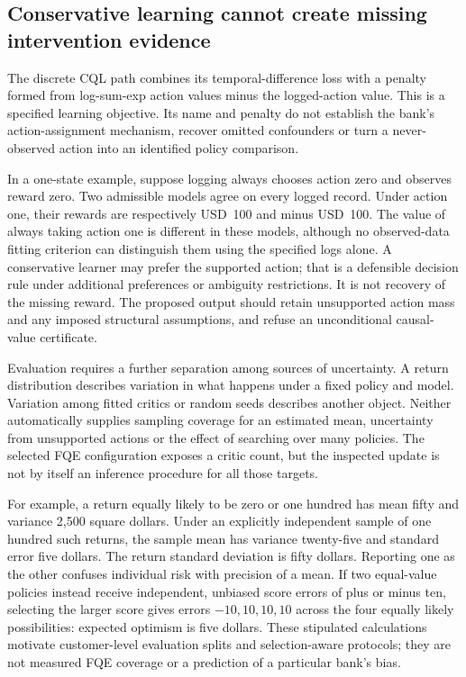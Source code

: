 \subsection{Conservative learning cannot create missing intervention evidence}

The discrete CQL path combines its temporal-difference loss with a penalty
formed from log-sum-exp action values minus the logged-action value. This is
a specified learning objective. Its name and penalty do not establish the
bank's action-assignment mechanism, recover omitted confounders or turn a
never-observed action into an identified policy comparison.
\citep{exec15_d3rlpy_value}

In a one-state example, suppose logging always chooses action zero and
observes reward zero. Two admissible models agree on every logged record.
Under action one, their rewards are respectively USD~100 and minus USD~100.
The value of always taking action one is different in these models, although
no observed-data fitting criterion can distinguish them using the specified
logs alone. A conservative learner may prefer the supported action; that is
a defensible decision rule under additional preferences or ambiguity
restrictions. It is not recovery of the missing reward. The proposed output
should retain unsupported action mass and any imposed structural assumptions,
and refuse an unconditional causal-value certificate.
\citep{exec15_d3rlpy_exact,exec15_d3rlpy_contract}

Evaluation requires a further separation among sources of uncertainty. A
return distribution describes variation in what happens under a fixed policy
and model. Variation among fitted critics or random seeds describes another
object. Neither automatically supplies sampling coverage for an estimated
mean, uncertainty from unsupported actions or the effect of searching over
many policies. The selected FQE configuration exposes a critic count, but the
inspected update is not by itself an inference procedure for all those
targets. \citep{exec15_d3rlpy_value,exec15_d3rlpy_contract}

For example, a return equally likely to be zero or one hundred has mean fifty
and variance 2,500 square dollars. Under an explicitly independent sample of
one hundred such returns, the sample mean has variance twenty-five and
standard error five dollars. The return standard deviation is fifty dollars.
Reporting one as the other confuses individual risk with precision of a mean.
If two equal-value policies instead receive independent, unbiased score
errors of plus or minus ten, selecting the larger score gives errors
\(-10,10,10,10\) across the four equally likely possibilities: expected
optimism is five dollars. These stipulated calculations motivate customer-level
evaluation splits and selection-aware protocols; they are not measured FQE
coverage or a prediction of a particular bank's bias.
\citep{exec15_d3rlpy_exact}

